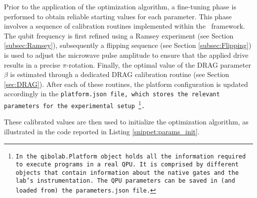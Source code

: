 Prior to the application of the optimization algorithm, a fine-tuning phase is performed to obtain reliable starting values for each parameter. 
This phase involves a sequence of calibration routines implemented within the \Qibocal\ framework.
The qubit frequency is first refined using a Ramsey experiment (see Section \ref{subsec:Ramsey}), subsequently a flipping sequence (see Section \ref{subsec:Flipping}) is used to adjust the microwave pulse amplitude to ensure that the applied drive results in a precise $\pi$-rotation.
Finally, the optimal value of the DRAG parameter $\beta$ is estimated through a dedicated DRAG calibration routine (see Section \ref{sec:DRAG}).
After each of these routines, the platform configuration is updated accordingly in the \tt{platform.json} file, which stores the relevant parameters for the experimental setup 
\footnote{In \Qibolab the \tt{qibolab.Platform} object holds all the information required to execute programs in a real QPU. It is comprised by different objects that contain information about the native gates and the lab's instrumentation. The QPU parameters can be saved in (and loaded from) the \tt{parameters.json} file.}.

These calibrated values are then used to initialize the optimization algorithm, as illustrated in the code reported in Listing \ref{snippet:params_init}.

